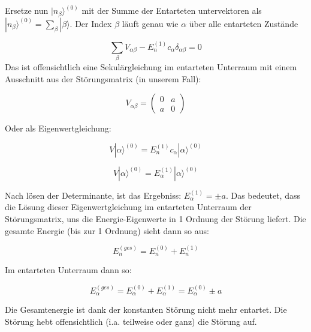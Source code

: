 Ersetze nun \(|n_\beta\rangle^{(0)}\) mit der Summe der Entarteten untervektoren als \(|n_\beta\rangle^{(0)} = \sum_\beta |\beta\rangle \). Der Index \(\beta\) läuft genau wie \(\alpha\) über alle entarteten Zustände

\[\sum_\beta V_{\alpha\beta}-E_n^{(1)}c_\alpha  \delta_{\alpha\beta} = 0\]
Das ist offensichtlich eine Sekulärgleichung im entarteten Unterraum mit einem Ausschnitt aus der Störungsmatrix (in unserem Fall):

\[V_{\alpha\beta} = \begin{pmatrix}0&a\\ a&0 \end{pmatrix} \]

Oder als Eigenwertgleichung:


\[V|\alpha\rangle ^{(0)} = E_n^{(1)}c_\alpha|\alpha\rangle ^{(0)}  \]

\[V|\alpha\rangle ^{(0)} = E_\alpha^{(1)} |\alpha\rangle ^{(0)}  \]

Nach lösen der Determinante, ist das Ergebniss:  \(E_\alpha^{(1)} = \pm a \).  Das bedeutet, dass die Lösung dieser Eigenwertgleichung im entarteten Unterraum der Störungsmatrix, uns die Energie-Eigenwerte in 1 Ordnung der Störung liefert. Die gesamte Energie (bis zur 1 Ordnung) sieht dann so aus:

\[E_n^{(ges)} = E_n^{(0)}+E_n^{(1)}\]

Im entarteten Unterraum dann so:

\[E_\alpha^{(ges)} = E_\alpha^{(0)}+E_\alpha^{(1)} =E_\alpha^{(0)}\pm a \]

Die Gesamtenergie ist dank der konstanten Störung nicht mehr entartet. Die Störung hebt offensichtlich (i.a. teilweise oder ganz) die Störung auf.






